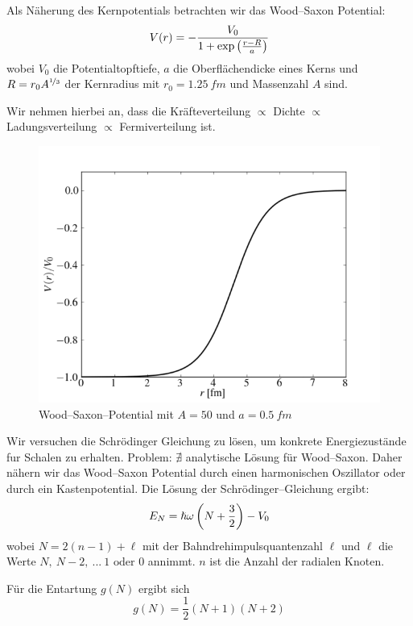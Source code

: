 \documentclass[Ex4_Zusammenfassung.tex]{subfiles}
\begin{document}
Als Näherung des Kernpotentials betrachten wir das Wood--Saxon Potential:
\begin{equation}
	V(r) = - \frac{V_0}{1+ \exp \left( \frac{r-R}{a} \right) }
\end{equation}
wobei $V_0$ die Potentialtopftiefe, $a$ die Oberflächendicke eines Kerns und $R = r_0 A^{\nicefrac{1}{3}}$ der Kernradius mit $r_0= \SI{1.25}{fm}$ und Massenzahl $A$ sind. 

Wir nehmen hierbei an, dass die Kräfteverteilung $\propto$ Dichte $\propto$ Ladungsverteilung $\propto$ Fermiverteilung ist.
\begin{figure}[h]
	\centering
	\includegraphics[scale=0.4]{woodsaxon.png}
	\caption{Wood--Saxon--Potential mit $A=50$ und $a=\SI{0.5}{fm}$}
\end{figure}

Wir versuchen die Schrödinger Gleichung zu lösen, um konkrete Energiezustände fur Schalen zu erhalten. \Lightning Problem: $\nexists$ analytische Lösung für Wood--Saxon. Daher nähern wir das Wood--Saxon Potential durch einen harmonischen Oszillator oder durch ein Kastenpotential. Die Lösung der Schrödinger--Gleichung ergibt:
\begin{equation}
	 E_N = \hslash \omega \left( N + \frac{3}{2} \right) - V_0
\end{equation}
wobei $N = 2(n-1) + \ell $ mit der Bahndrehimpulsquantenzahl $\ell$ und $\ell$ die Werte $N,\ N-2,\ ...\ 1 \text{ oder } 0$ annimmt. $n$ ist die Anzahl der radialen Knoten.

Für die Entartung $g(N)$ ergibt sich
\begin{equation}
	g(N) = \frac{1}{2} (N+1)(N+2)
\end{equation} 
\end{document}
